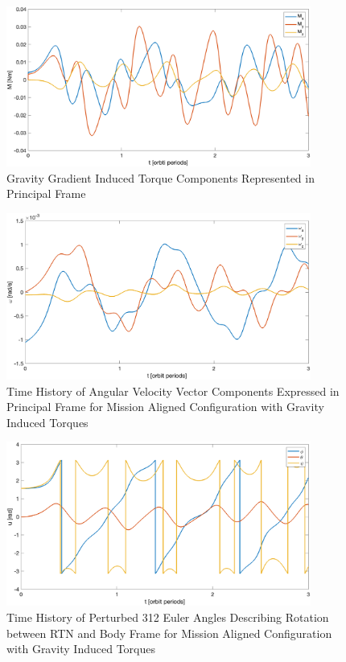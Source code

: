 \begin{figure}[H]
    \centering
    \captionsetup{ justification = centering}
    \includegraphics[width = 10cm]{Images/PS4/gravity_torque_mission_aligned.png}
    \caption{Gravity Gradient Induced Torque Components Represented in Principal Frame}
    \label{fig:gravity_gradienet_mission_aligned}
\end{figure}

\begin{figure}[H]
    \centering
    \captionsetup{ justification = centering}
    \includegraphics[width = 10cm]{Images/PS4/angular_velocity_under_grav.png}
    \caption{Time History of Angular Velocity Vector Components Expressed in Principal Frame for Mission Aligned Configuration with Gravity Induced Torques}
    \label{fig:grav_mission_velocities}
\end{figure}

\begin{figure}[H]
    \centering
    \captionsetup{justification = centering}
    \includegraphics[width = 10cm]{Images/PS4/attitude_under_grav.png}
    \caption{Time History of Perturbed 312 Euler Angles Describing Rotation between RTN and Body Frame for Mission Aligned Configuration with Gravity Induced Torques}
    \label{fig:grav_mission_attitudes}
\end{figure}
